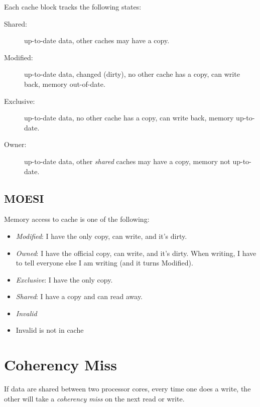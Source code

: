 Each cache block tracks the following states:
\begin{description}
	\item[Shared:] up-to-date data, other caches may have a copy.
	\item[Modified:] up-to-date data, changed (dirty), no other cache has a copy, can write back, memory out-of-date.
	\item[Exclusive:] up-to-date data, no other cache has a copy, can write back, memory up-to-date.
	\item[Owner:] up-to-date data, other \emph{shared} caches may have a copy, memory not up-to-date.
\end{description}

\subsection{MOESI}
Memory access to cache is one of the following:
\begin{itemize}
    \item \emph{Modified}: I have the only copy, can write, and it's dirty.
    \item \emph{Owned}: I have the official copy, can write, and it's dirty. When writing, I have to tell everyone else I am writing (and it turns Modified).
    \item \emph{Exclusive}: I have the only copy.
    \item \emph{Shared}: I have a copy and can read away.
    \item \emph{Invalid}
\end{itemize}
\begin{itemize}
    \item Invalid is not in cache
\end{itemize}

\section{Coherency Miss}
If data are shared between two processor cores, every time one does a write, the other will take a \emph{coherency miss} on the next read or write. 